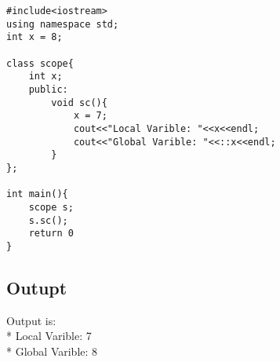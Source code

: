 \begin{lstlisting}
#include<iostream>
using namespace std;
int x = 8;

class scope{
	int x;
	public: 
		void sc(){
			x = 7;
			cout<<"Local Varible: "<<x<<endl;
			cout<<"Global Varible: "<<::x<<endl;
		}
};

int main(){
	scope s;
	s.sc();
	return 0
}

\end{lstlisting}
\subsection{Outupt}
Output is:  
\\* \tab Local Varible: 7
\\* \tab Global Varible: 8
